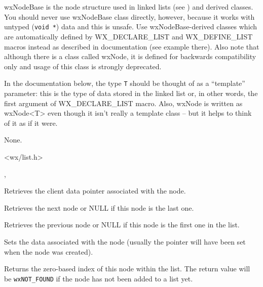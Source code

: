 \section{}\label{wxnode}

wxNodeBase is the node structure used in linked lists (see 
) and derived classes. You should never use wxNodeBase
class directly, however, because it works with untyped ({\tt void *}) data and
this is unsafe. Use wxNodeBase-derived classes which are automatically defined
by WX\_DECLARE\_LIST and WX\_DEFINE\_LIST macros instead as described in
 documentation (see example there). Also note that
although there is a class called wxNode, it is defined for backwards
compatibility only and usage of this class is strongly deprecated.

In the documentation below, the type {\tt T} should be thought of as a
``template'' parameter: this is the type of data stored in the linked list or,
in other words, the first argument of WX\_DECLARE\_LIST macro. Also, wxNode is
written as wxNode<T> even though it isn't really a template class -- but it
helps to think of it as if it were.


None.


<wx/list.h>




, 


\label{wxnodegetdata}


Retrieves the client data pointer associated with the node.

\label{wxnodegetnext}


Retrieves the next node or NULL if this node is the last one.

\label{wxnodegetprevious}


Retrieves the previous node or NULL if this node is the first one in the list.

\label{wxnodesetdata}


Sets the data associated with the node (usually the pointer will have been
set when the node was created).

\label{wxnodeindexof}


Returns the zero-based index of this node within the list. The return value
will be {\tt wxNOT\_FOUND} if the node has not been added to a list yet.

